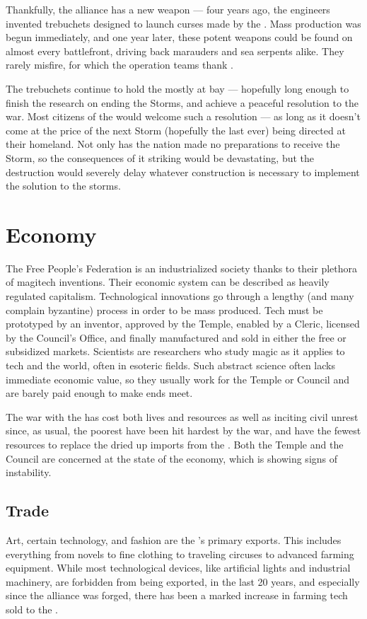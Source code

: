 \documentclass[blue]{GL2020}
\begin{document}
Thankfully, the alliance has a new weapon — four years ago, the \pTech{} engineers invented trebuchets designed to launch curses made by the \pFarm{}. Mass production was begun immediately, and one year later, these potent weapons could be found on almost every battlefront, driving back \pShippie{} marauders and sea serpents alike. They rarely misfire, for which the operation teams thank \cTechGod{}. 

The trebuchets continue to hold the \pShip{} mostly at bay — hopefully long enough to finish the research on ending the Storms, and achieve a peaceful resolution to the war. Most citizens of the \pTech{} would welcome such a resolution — as long as it doesn't come at the price of the next Storm (hopefully the last ever) being directed at their homeland. Not only has the nation made no preparations to receive the Storm, so the consequences of it striking would be devastating, but the destruction would severely delay whatever construction is necessary to implement the solution to the storms.
    
\section*{Economy}
The Free People's Federation is an industrialized society thanks to their plethora of magitech inventions. Their economic system can be described as heavily regulated capitalism. Technological innovations go through a lengthy (and many complain byzantine) process in order to be mass produced. Tech must be prototyped by an inventor, approved by the Temple, enabled by a Cleric, licensed by the Council's Office, and finally manufactured and sold in either the free or subsidized markets. Scientists are researchers who study magic as it applies to tech and the world, often in esoteric fields. Such abstract science often lacks immediate economic value, so they usually work for the Temple or Council and are barely paid enough to make ends meet. 

The war with the \pShip{} has cost both lives and resources as well as inciting civil unrest since, as usual, the poorest have been hit hardest by the war, and have the fewest resources to replace the dried up imports from the \pShippies{}. Both the Temple and the Council are concerned at the state of the economy, which is showing signs of instability.

\subsection*{Trade}
Art, certain technology, and fashion are the \pTech{}'s primary exports. This includes everything from novels to fine clothing to traveling circuses to advanced farming equipment. While most technological devices, like artificial lights and industrial machinery, are forbidden from being exported, in the last 20 years, and especially since the alliance was forged, there has been a marked increase in farming tech sold to the \pFarm{}.
\end{document}
